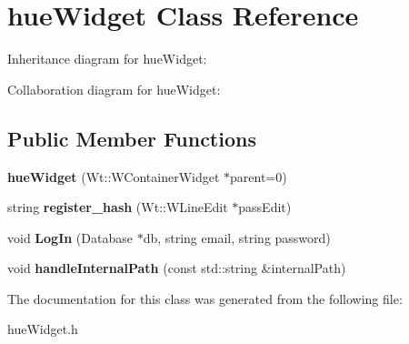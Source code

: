 \hypertarget{classhueWidget}{}\section{hue\+Widget Class Reference}
\label{classhueWidget}


Inheritance diagram for hue\+Widget\+:


Collaboration diagram for hue\+Widget\+:
\subsection*{Public Member Functions}
\begin{DoxyCompactItemize}
\item 
\mbox{\label{classhueWidget_ad17d68b26229670f9c2389b165bfabd3}} 
{\bfseries hue\+Widget} (Wt\+::\+W\+Container\+Widget $\ast$parent=0)
\item 
\mbox{\label{classhueWidget_a946973d3106132720c8a755d71c5e3bc}} 
string {\bfseries register\+\_\+hash} (Wt\+::\+W\+Line\+Edit $\ast$pass\+Edit)
\item 
\mbox{\label{classhueWidget_addf1c40bcb27de734eada334fb8cdf17}} 
void {\bfseries Log\+In} (Database $\ast$db, string email, string password)
\item 
\mbox{\label{classhueWidget_a8244c48645533e80df95ae54b328764d}} 
void {\bfseries handle\+Internal\+Path} (const std\+::string \&internal\+Path)
\end{DoxyCompactItemize}


The documentation for this class was generated from the following file\+:\begin{DoxyCompactItemize}
\item 
hue\+Widget.\+h\end{DoxyCompactItemize}
